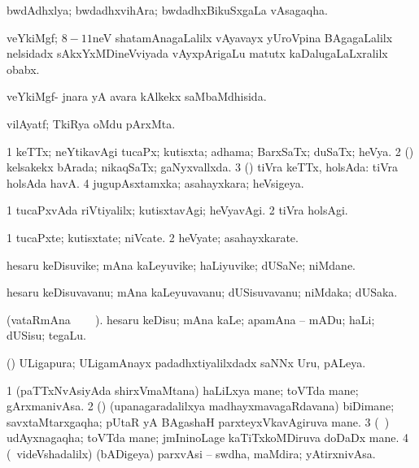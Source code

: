 {{{{{{\bentry
{} 
\gl{\nA}
\expl{}
\bmng
 bwdAdhxlya; bwdadhxvihAra; bwdadhxBikuSxgaLa vAsagaqha. 
\emng
\eentry

\bentry
{} 
\gl{\nA}
\expl{}
\bmng
 veYkiMgf; $8-11$neV shatamAnagaLalilx vAyavayx yUroVpina BAgagaLalilx nelsidadx sAkxYxMDineVviyada vAyxpArigaLu matutx kaDalugaLaLxralilx obabx. 
\emng
\eentry

\bentry
{} 
\gl{\gu}
\expl{}
\bmng
 veYkiMgf- jnara yA avara kAlkekx saMbaMdhisida. 
\emng
\eentry

\bentry
{} 
\gl{\nA}
\expl{}
\bmng
 vilAyatf; TkiRya oMdu pArxMta. 
\emng
\eentry

\bentry
{} 
\gl{\gu}
\expl{}
\bmng
\bnum
\num{1} keTTx; neYtikavAgi tucaPx; kutisxta; adhama; BarxSaTx; duSaTx; heVya. 
\num{2} (\pArxparx) kelsakekx bArada; nikaqSaTx; gaNyxvallxda. 
\num{3} (\AmA) tiVra keTTx, holsAda:  tiVra holsAda havA. 
\num{4} jugupAsxtamxka; asahayxkara; heVsigeya. 
\enum
\emng
\eentry

\bentry
{} 
\gl{\kirxvi}
\expl{}
\bmng
\bnum
\num{1} tucaPxvAda riVtiyalilx; kutisxtavAgi; heVyavAgi. 
\num{2} tiVra holsAgi. 
\enum
\emng
\eentry

\bentry
{} 
\gl{\nA}
\expl{}
\bmng
\bnum
\num{1} tucaPxte; kutisxtate; niVcate. 
\num{2} heVyate; asahayxkarate. 
\enum
\emng
\eentry

\bentry
{} 
\gl{\nA}
\expl{}
\bmng
 hesaru keDisuvike; mAna kaLeyuvike; haLiyuvike; dUSaNe; niMdane. 
\emng
\eentry

\bentry
{} 
\gl{\nA}
\expl{}
\bmng
 hesaru keDisuvavanu; mAna kaLeyuvavanu; dUSisuvavanu; niMdaka; dUSaka. 
\emng
\eentry

\bentry
{} 
\gl{\sakirx}(vataRmAna \parxpu\ \Eva\ 
\BUkaq\ ). \bmng
 hesaru keDisu; mAna kaLe; apamAna -- mADu; haLi; dUSisu; tegaLu. 
\emng
\eentry

\bentry
{} 
\gl{\nA}
\expl{}
\bmng
 (\ca) ULigapura; ULigamAnayx padadhxtiyalilxdadx saNNx Uru, pALeya. 
\emng
\eentry

\bentry
{} 
\gl{\nA}
\expl{}
\bmng
\bnum
\num{1} (paTTxNvAsiyAda shirxVmaMtana) haLiLxya mane; toVTda mane; gArxmanivAsa. 
\num{2} (\birx) (upanagaradalilxya madhayxmavagaRdavana) biDimane; savxtaMtarxgaqha; pUtaR yA BAgashaH parxteyxVkavAgiruva mane. 
\num{3} (\roV\ \pArxkatx) udAyxnagaqha; toVTda mane; jmIninoLage kaTiTxkoMDiruva doDaDx mane. 
\num{4} (\kanmu\ videVshadalilx) (bADigeya) parxvAsi -- swdha, maMdira; yAtirxnivAsa. 
\enum
\emng
\eentry

}}}}}}

